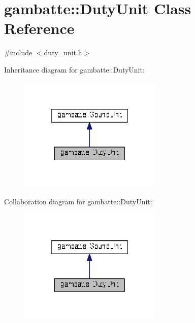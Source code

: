 \hypertarget{classgambatte_1_1DutyUnit}{}\section{gambatte\+:\+:Duty\+Unit Class Reference}
\label{classgambatte_1_1DutyUnit}


{\ttfamily \#include $<$duty\+\_\+unit.\+h$>$}



Inheritance diagram for gambatte\+:\+:Duty\+Unit\+:\nopagebreak
\begin{figure}[H]
\begin{center}
\leavevmode
\includegraphics[width=193pt]{classgambatte_1_1DutyUnit__inherit__graph}
\end{center}
\end{figure}


Collaboration diagram for gambatte\+:\+:Duty\+Unit\+:\nopagebreak
\begin{figure}[H]
\begin{center}
\leavevmode
\includegraphics[width=193pt]{classgambatte_1_1DutyUnit__coll__graph}
\end{center}
\end{figure}
